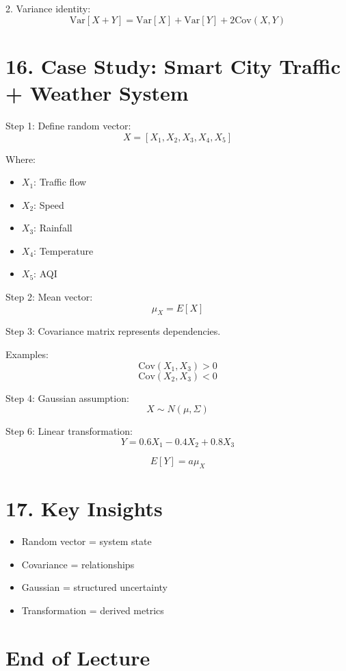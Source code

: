 \documentclass[12pt]{article}
\begin{document}
2. Variance identity:
\[
\text{Var}[X + Y] = \text{Var}[X] + \text{Var}[Y] + 2\text{Cov}(X,Y)
\]

\section*{16. Case Study: Smart City Traffic + Weather System}

Step 1: Define random vector:
\[
X = [X_1, X_2, X_3, X_4, X_5]
\]

Where:
\begin{itemize}
\item $X_1$: Traffic flow
\item $X_2$: Speed
\item $X_3$: Rainfall
\item $X_4$: Temperature
\item $X_5$: AQI
\end{itemize}

Step 2: Mean vector:
\[
\mu_X = E[X]
\]

Step 3: Covariance matrix represents dependencies.

Examples:
\[
\text{Cov}(X_1, X_3) > 0
\]
\[
\text{Cov}(X_2, X_3) < 0
\]

Step 4: Gaussian assumption:
\[
X \sim N(\mu, \Sigma)
\]

Step 6: Linear transformation:
\[
Y = 0.6X_1 - 0.4X_2 + 0.8X_3
\]

\[
E[Y] = a\mu_X
\]

\section*{17. Key Insights}

\begin{itemize}
\item Random vector = system state
\item Covariance = relationships
\item Gaussian = structured uncertainty
\item Transformation = derived metrics
\end{itemize}

\section*{End of Lecture}
\end{document}
